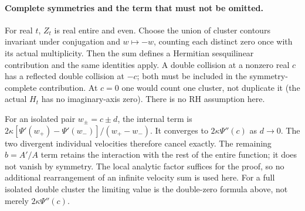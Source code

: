 \documentclass[11pt]{article}
\theoremstyle{remark}
\begin{document}
\paragraph{Complete symmetries and the term that must not be omitted.}
For real $t$, $Z_t$ is real entire and even. Choose the union of
cluster contours invariant under conjugation and $w\mapsto-w$,
counting each distinct zero once with its actual multiplicity.
Then the sum defines a Hermitian sesquilinear contribution and the
same identities apply. A double collision at a nonzero real $c$
has a reflected double collision at $-c$; both must be included
in the symmetry-complete contribution. At $c=0$ one would count
one cluster, not duplicate it (the actual $H_t$ has no imaginary-axis
zero). There is no RH assumption here.

For an isolated pair $w_\pm=c\pm d$, the internal term is
$2\kappa[\Psi'(w_+)-\Psi'(w_-)]/(w_+-w_-)$.
It converges to $2\kappa\Psi''(c)$ as $d\to0$.
The two divergent individual velocities therefore cancel exactly.
The remaining $b=A'/A$ term retains the interaction with the rest
of the entire function; it does not vanish by symmetry. The local
analytic factor suffices for the proof, so no additional rearrangement
of an infinite velocity sum is used here. For a full isolated double
cluster the limiting value is the double-zero formula above, not
merely $2\kappa\Psi''(c)$.
\end{document}
